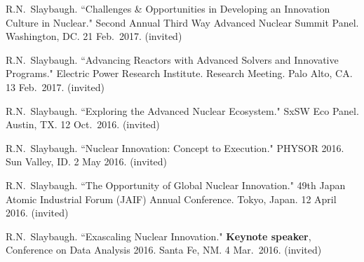\begin{bibsection}

\item R.N.\ Slaybaugh. ``Challenges \& Opportunities in Developing an Innovation Culture in Nuclear." Second Annual Third Way Advanced Nuclear Summit Panel. Washington, DC. 21 Feb.\ 2017. (invited)

\item R.N.\ Slaybaugh. ``Advancing Reactors with Advanced Solvers and Innovative Programs." Electric Power Research Institute. Research Meeting. Palo Alto, CA. 13 Feb.\ 2017. (invited)

\item R.N.\ Slaybaugh. ``Exploring the Advanced Nuclear Ecosystem." SxSW Eco Panel. Austin, TX. 12 Oct.\ 2016. (invited)




\item R.N.\ Slaybaugh. ``Nuclear Innovation: Concept to Execution." PHYSOR 2016. Sun Valley, ID. 2 May 2016. (invited)


\item R.N.\ Slaybaugh. ``The Opportunity of Global Nuclear Innovation." 49th Japan Atomic Industrial Forum (JAIF) Annual Conference. Tokyo, Japan. 12 April 2016. (invited)

\item R.N.\ Slaybaugh. ``Exascaling Nuclear Innovation." \textbf{Keynote speaker}, Conference on Data Analysis 2016. Santa Fe, NM. 4 Mar.\ 2016. (invited) 


\end{bibsection}
